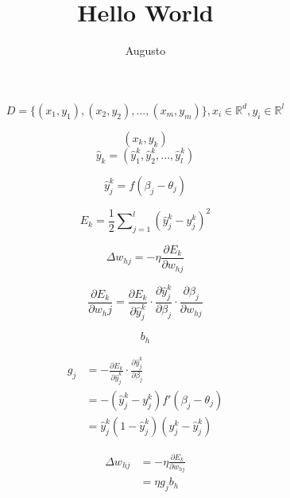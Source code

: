 \documentclass{article}
\title{Hello World}
\author {Augusto}
\begin{document}
\begin{equation}\label{set}
  D = \{(x_1,y_1),(x_2,y_2),...,(x_m,y_m)\}, x_i \in \mathbb{R}^d, y_i \in \mathbb{R}^l
\end{equation}

\begin{equation}\label{sample}
  (x_k,y_k)
\end{equation}
\begin{equation}\label{output}
  \hat{y}_k = (\hat{y}_1^k, \hat{y}_2^k,...,\hat{y}_l^k)
\end{equation}

\begin{equation}\label{yk}
  \hat{y}_j^k = f(\beta_j - \theta_j)
\end{equation}

\begin{equation}\label{error}
  E_k = \frac{1}{2}\sum\nolimits_{j=1}^{l}( \hat{y}_j^k - y_j^k)^2
\end{equation}

\begin{equation}\label{deltaw}
  \Delta w_{hj} = - \eta \frac{\partial E_k}{\partial w_{hj}}
\end{equation}

\begin{equation}\label{chain}
  \frac{\partial E_k}{\partial w_hj} = \frac{\partial E_k}{\partial \hat{y}_j^k} \cdot \frac{\partial \hat{y}_j^k}{\partial \beta_j} \cdot \frac{\partial \beta_j}{\partial w_{hj}}
\end{equation}

\begin{equation}\label{bh}
  b_h
\end{equation}

\begin{equation}\label{gj}
\begin{split}
  g_j & = - \frac{\partial E_k}{\partial \hat{y}_j^k} \cdot \frac{\partial \hat{y}_j^k}{\partial \beta_j} \\
   & = -(\hat{y}_j^k - y_j^k)f'(\beta_j - \theta_j) \\
   & = \hat{y}_j^k(1- \hat{y}_j^k)(y_j^k - \hat{y}_j^k)
\end{split}
\end{equation}

\begin{equation}\label{whj}
\begin{split}
  \Delta w_{hj} & = - \eta \frac{\partial E_k}{\partial w_{hj}} \\
   & = \eta g_j b_h
\end{split}
\end{equation}
\end{document}
